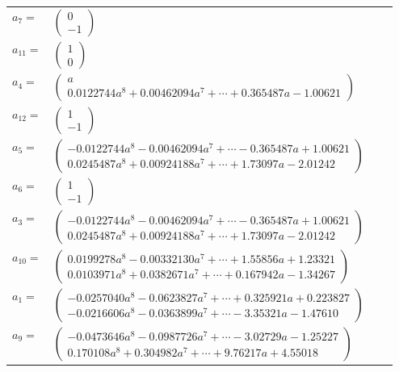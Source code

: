 \documentclass[1p]{elsarticle_modified}
\theoremstyle{definition}
\begin{document}
\begin{tabular}{m{7pt} m{180pt} m{7pt} m{180pt} }
\flushright $a_{7}=$&$\begin{pmatrix}0\\-1\end{pmatrix}$ \\
\flushright $a_{11}=$&$\begin{pmatrix}1\\0\end{pmatrix}$ \\
\flushright $a_{4}=$&$\begin{pmatrix}a\\0.0122744 a^{8}+0.00462094 a^{7}+\cdots+0.365487 a-1.00621\end{pmatrix}$ \\
\flushright $a_{12}=$&$\begin{pmatrix}1\\-1\end{pmatrix}$ \\
\flushright $a_{5}=$&$\begin{pmatrix}-0.0122744 a^{8}-0.00462094 a^{7}+\cdots-0.365487 a+1.00621\\0.0245487 a^{8}+0.00924188 a^{7}+\cdots+1.73097 a-2.01242\end{pmatrix}$ \\
\flushright $a_{6}=$&$\begin{pmatrix}1\\-1\end{pmatrix}$ \\
\flushright $a_{3}=$&$\begin{pmatrix}-0.0122744 a^{8}-0.00462094 a^{7}+\cdots-0.365487 a+1.00621\\0.0245487 a^{8}+0.00924188 a^{7}+\cdots+1.73097 a-2.01242\end{pmatrix}$ \\
\flushright $a_{10}=$&$\begin{pmatrix}0.0199278 a^{8}-0.00332130 a^{7}+\cdots+1.55856 a+1.23321\\0.0103971 a^{8}+0.0382671 a^{7}+\cdots+0.167942 a-1.34267\end{pmatrix}$ \\
\flushright $a_{1}=$&$\begin{pmatrix}-0.0257040 a^{8}-0.0623827 a^{7}+\cdots+0.325921 a+0.223827\\-0.0216606 a^{8}-0.0363899 a^{7}+\cdots-3.35321 a-1.47610\end{pmatrix}$ \\
\flushright $a_{9}=$&$\begin{pmatrix}-0.0473646 a^{8}-0.0987726 a^{7}+\cdots-3.02729 a-1.25227\\0.170108 a^{8}+0.304982 a^{7}+\cdots+9.76217 a+4.55018\end{pmatrix}$ \\

\end{tabular}
\end{document}
